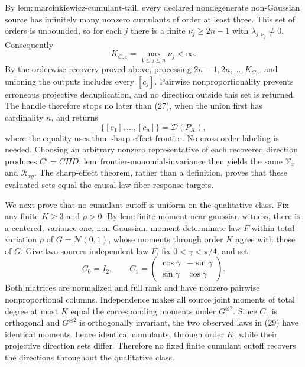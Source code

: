 By \(\mathrm{lem:marcinkiewicz\text{-}cumulant\text{-}tail}\), every declared nondegenerate non-Gaussian source has infinitely many nonzero cumulants of order at least three. This set of orders is unbounded, so for each \(j\) there is a finite \(\nu_j\ge2n-1\) with \(\lambda_{j,\nu_j}\ne0\). Consequently
\[
 K_{C,\varepsilon}=\max_{1\le j\le n}\nu_j<\infty. \tag{27}
\]
By the orderwise recovery proved above, processing \(2n-1,2n,\ldots,K_{C,\varepsilon}\) and unioning the outputs includes every \([c_j]\). Pairwise nonproportionality prevents erroneous projective deduplication, and no direction outside this set is returned. The handle therefore stops no later than (27), when the union first has cardinality \(n\), and returns
\[
 \{[c_1],\ldots,[c_n]\}=\mathcal D(P_X), \tag{28}
\]
where the equality uses \(\mathrm{thm:sharp\text{-}effect\text{-}frontier}\). No cross-order labeling is needed. Choosing an arbitrary nonzero representative of each recovered direction produces \(C'=C\Pi D\); \(\mathrm{lem:frontier\text{-}monomial\text{-}invariance}\) then yields the same \(\mathcal V_x\) and \(\mathcal R_{xy}\). The sharp-effect theorem, rather than a definition, proves that these evaluated sets equal the causal law-fiber response targets.

We next prove that no cumulant cutoff is uniform on the qualitative class. Fix any finite \(K\ge3\) and \(\rho>0\). By \(\mathrm{lem:finite\text{-}moment\text{-}near\text{-}gaussian\text{-}witness}\), there is a centered, variance-one, non-Gaussian, moment-determinate law \(F\) within total variation \(\rho\) of \(G=\mathcal N(0,1)\), whose moments through order \(K\) agree with those of \(G\). Give two sources independent law \(F\), fix \(0<\gamma<\pi/4\), and set
\[
 C_0=I_2,
 \qquad
 C_1=
 \begin{pmatrix}
 \cos\gamma&-\sin\gamma\\
 \sin\gamma&\cos\gamma
 \end{pmatrix}. \tag{29}
\]
Both matrices are normalized and full rank and have nonzero pairwise nonproportional columns. Independence makes all source joint moments of total degree at most \(K\) equal the corresponding moments under \(G^{\otimes2}\). Since \(C_1\) is orthogonal and \(G^{\otimes2}\) is orthogonally invariant, the two observed laws in (29) have identical moments, hence identical cumulants, through order \(K\), while their projective direction sets differ. Therefore no fixed finite cumulant cutoff recovers the directions throughout the qualitative class.

